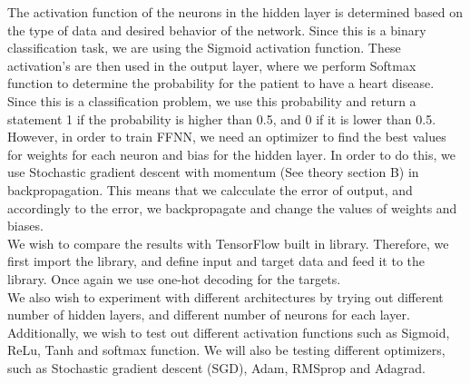 \documentclass[reprint,english,notitlepage]{revtex4-1}  %
\begin{document}
The activation function of the neurons in the hidden layer is determined based on the type of data and desired behavior of the network. Since this is a binary classification task, we are using the Sigmoid \cite{proj2} activation function. These activation's are then used in the output layer, where we perform Softmax function \cite{proj2} to determine the probability for the patient to have a heart disease. Since this is a classification problem, we use this probability and return a statement 1 if the probability is higher than 0.5, and 0 if it is lower than 0.5.
\vspace{3mm}
\\
However, in order to train FFNN, we need an optimizer to find the best values for weights for each neuron and bias for the hidden layer. In order to do this, we use Stochastic gradient descent with momentum (See \cite{proj2} theory section B) in backpropagation. This means that we calcculate the error of output, and accordingly to the error, we backpropagate and change the values of weights and biases.
\vspace{3mm}
\\
We wish to compare the results with TensorFlow built in library. Therefore, we first import the library, and define input and target data and feed it to the library. Once again we use one-hot decoding for the targets. 
\vspace{3mm}
\\
We also wish to experiment with different architectures by trying out different number of hidden layers, and different number of neurons for each layer. Additionally, we wish to test out different activation functions such as Sigmoid, ReLu, Tanh and softmax function. We will also be testing different optimizers, such as Stochastic gradient descent (SGD), Adam, RMSprop and Adagrad. 
\end{document}
